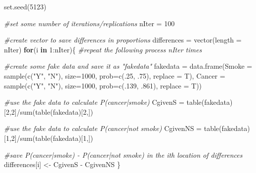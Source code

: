 \documentclass[
  openany]{book}
\newenvironment{Shaded}{\begin{snugshade}}{\end{snugshade}}
\newcommand{\AttributeTok}[1]{\textcolor[rgb]{0.77,0.63,0.00}{#1}}
\newcommand{\CommentTok}[1]{\textcolor[rgb]{0.56,0.35,0.01}{\textit{#1}}}
\newcommand{\ControlFlowTok}[1]{\textcolor[rgb]{0.13,0.29,0.53}{\textbf{#1}}}
\newcommand{\DecValTok}[1]{\textcolor[rgb]{0.00,0.00,0.81}{#1}}
\newcommand{\FunctionTok}[1]{\textcolor[rgb]{0.00,0.00,0.00}{#1}}
\newcommand{\NormalTok}[1]{#1}
\newcommand{\OtherTok}[1]{\textcolor[rgb]{0.56,0.35,0.01}{#1}}
\newcommand{\SpecialCharTok}[1]{\textcolor[rgb]{0.00,0.00,0.00}{#1}}
\newcommand{\StringTok}[1]{\textcolor[rgb]{0.31,0.60,0.02}{#1}}
\begin{document}
\begin{Shaded}
\begin{Highlighting}[]
\FunctionTok{set.seed}\NormalTok{(}\DecValTok{5123}\NormalTok{)}

\CommentTok{\#set some number of iterations/replications}
\NormalTok{nIter }\OtherTok{=} \DecValTok{100}

\CommentTok{\#create vector to save differences in proportions}
\NormalTok{differences }\OtherTok{=} \FunctionTok{vector}\NormalTok{(}\AttributeTok{length =}\NormalTok{ nIter) }
\ControlFlowTok{for}\NormalTok{(i }\ControlFlowTok{in} \DecValTok{1}\SpecialCharTok{:}\NormalTok{nIter)\{ }\CommentTok{\#repeat the following process nIter times}

  \CommentTok{\#create some fake data and save it as "fakedata"}
\NormalTok{  fakedata }\OtherTok{=} \FunctionTok{data.frame}\NormalTok{(}\AttributeTok{Smoke =} \FunctionTok{sample}\NormalTok{(}\FunctionTok{c}\NormalTok{(}\StringTok{"Y"}\NormalTok{, }\StringTok{"N"}\NormalTok{), }\AttributeTok{size=}\DecValTok{1000}\NormalTok{, }
                                       \AttributeTok{prob=}\FunctionTok{c}\NormalTok{(.}\DecValTok{25}\NormalTok{, .}\DecValTok{75}\NormalTok{), }\AttributeTok{replace =}\NormalTok{ T),}
                        \AttributeTok{Cancer =} \FunctionTok{sample}\NormalTok{(}\FunctionTok{c}\NormalTok{(}\StringTok{"Y"}\NormalTok{, }\StringTok{"N"}\NormalTok{), }\AttributeTok{size=}\DecValTok{1000}\NormalTok{, }
                                        \AttributeTok{prob=}\FunctionTok{c}\NormalTok{(.}\DecValTok{139}\NormalTok{, .}\DecValTok{861}\NormalTok{), }\AttributeTok{replace =}\NormalTok{ T))}

  \CommentTok{\#use the fake data to calculate P(cancer|smoke)}
\NormalTok{  CgivenS }\OtherTok{=} \FunctionTok{table}\NormalTok{(fakedata)[}\DecValTok{2}\NormalTok{,}\DecValTok{2}\NormalTok{]}\SpecialCharTok{/}\FunctionTok{sum}\NormalTok{(}\FunctionTok{table}\NormalTok{(fakedata)[}\DecValTok{2}\NormalTok{,])}

  \CommentTok{\#use the fake data to calculate P(cancer|not smoke)}
\NormalTok{  CgivenNS }\OtherTok{=} \FunctionTok{table}\NormalTok{(fakedata)[}\DecValTok{1}\NormalTok{,}\DecValTok{2}\NormalTok{]}\SpecialCharTok{/}\FunctionTok{sum}\NormalTok{(}\FunctionTok{table}\NormalTok{(fakedata)[}\DecValTok{1}\NormalTok{,])}

  \CommentTok{\#save P(cancer|smoke) {-} P(cancer|not smoke) in the ith location of differences}
\NormalTok{  differences[i] }\OtherTok{\textless{}{-}}\NormalTok{ CgivenS }\SpecialCharTok{{-}}\NormalTok{ CgivenNS}
\NormalTok{\}}


\end{Highlighting}
\end{Shaded}
\end{document}
